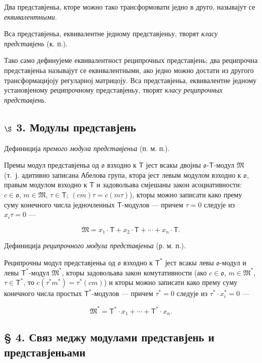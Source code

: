 \documentclass[11pt]{article}
\begin{document}
Два представјеньа, кторе можно тако трансформовати једно в друго, называјут се \emph{еквивалентными}.

Вса представјеньа, еквивалентне једному представјеньу, творят \emph{класу представјень} (к. п.).

Тако само дефинујеме еквивалентност реципрочных представјень; два реципрочна представјеньа называјут се еквивалентными, ако једно можно достати из другого трансформацијоју регуларној матрицоју. Вса представјеньа, еквивалентне једному установјеному реципрочному представјеньу, творят \emph{класу реципрочных представјень}.

\subsection*{\texorpdfstring{\(\S\) 3. Модулы представјень}{\textbackslash С 3. Модулы представјень}}\label{s-3.-darstellungsmoduln}

Дефиниција \emph{премого модула представјеньа} (п. м. п.).

Премы модул представјеньа од \(\mathfrak{o}\) взходно к \(\mathsf T\) јест всакы двојны \(\mathfrak{o}\)-\(\mathsf T\)-модул \(\mathfrak M\) (т.~ј. адитивно записана Абелова група, ктора јест левым модулом взходно к \(\mathfrak{o}\), правым модулом взходно к \(\mathsf T\) и задовольава смјешаны закон асоциативности: \(c\in\mathfrak{o}\), \(m\in\mathfrak M\), \(\tau\in\mathsf T\); \((cm)\tau=c(m\tau)\)), кторы можно записати како прему суму конечного числа једночленных \(\mathsf T\)-модулов --- причем \(\tau=0\) следује из \(x_i\tau=0\) ---

\[
\mathfrak M=x_1\cdot\mathsf T+x_2\cdot\mathsf T+\cdots+x_n\cdot\mathsf T.
\]

Дефиниција \emph{реципрочного модула представјеньа} (р. м. п.).

Реципрочны модул представјеньа од \(\mathfrak{o}\) взходно к \(\mathsf T^*\) јест всакы левы \(\mathfrak{o}\)-модул и левы \(\mathsf T^*\)-модул \(\mathfrak M^*\), кторы задовольава закон комутативности (ако \(c\in\mathfrak{o}\), \(m\in\mathfrak M^*\), \(\tau\in\mathsf T^*\), то \(c(\tau^*m^*)=\tau^*(cm)\)) и кторы можно записати како прему суму конечного числа простых \(\mathsf T^*\)-модулов --- причем \(\tau^*=0\) следује из \(\tau^*\cdot x_i^*=0\) ---

\[
\mathfrak M^*=\mathsf T^*\cdot x_1+\cdots+\mathsf T^*\cdot x_n.
\]

\subsection*{§ 4. Связ меджу модулами представјень и представјеньами}\label{der-zusammenhang-zwischen-darstellungsmoduln-und-darstellungen}
\end{document}
